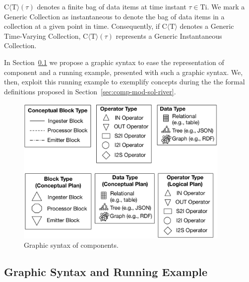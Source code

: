 {C$\langle\mathrm{T}\rangle(\tau)$ denotes a finite bag of data items at time instant $\tau \in \mathrm{Ti}$. 
We mark a Generic Collection as \textsf{instantaneous} to denote the bag of data items in a collection at a given point in time. Consequently, if C$\langle\mathrm{T}\rangle$ denotes a Generic Time-Varying Collection, C$\langle\mathrm{T}\rangle(\tau)$ represents a Generic Instantaneous Collection.

In Section~\ref{sec:comp-mod-sol-re} we propose a graphic syntax to ease the representation of \river{} component and a running example, presented with such a graphic syntax. We, then, exploit this running example to exemplify \river{} concepts during the the formal definitions proposed in Section~\ref{sec:comp-mod-sol-river}.

\begin{figure}[t]
  \centering
  \includegraphics[width=0.92\textwidth]{img/computational-model-syntax}
  \caption{Graphic syntax of \textnormal{\protect\river{}} components.}
  \label{fig:sti_gs}
\end{figure} 

\subsection{Graphic Syntax and Running Example}\label{sec:comp-mod-sol-re}

}
